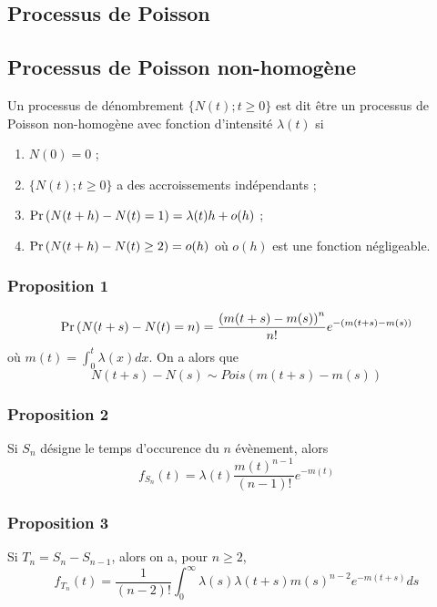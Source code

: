\documentclass[10pt, french, landscape]{article}
\begin{document}
\small
\begin{multicols*}{3} %
\setcounter{section}{2}

\section{Processus de Poisson}
\subsection*{Processus de Poisson non-homogène}
\begin{definition}[Définition]
Un processus de dénombrement $\{ N(t) ; t \geq 0 \}$ est dit être un processus de Poisson non-homogène avec fonction d'intensité $\lambda(t)$ si
\begin{enumerate}[label=(\arabic*)]
\item $N(0) = 0$ ;
\item $\{ N(t) ; t \geq 0 \}$ a des accroissements indépendants ;
\item $\Pr \left( N(t+h) - N(t) = 1 \right) = \lambda(t) h + o(h)$ ;
\item $\Pr \left( N(t+h) - N(t) \geq 2 \right) = o(h)$ où $o(h)$ est une fonction négligeable.
\end{enumerate}
\end{definition}

\subsubsection*{Proposition 1}
\[\Pr \left( N(t+s) - N(t) = n \right)  = \frac{\left(m(t+s) - m(s) \right)^n}{n!} e^{-(m(t+s) - m(s))} \]
où $m(t) = \int_{0}^{t} \lambda(x) dx$. On a alors que
\[N(t+s) - N(s) \sim Pois(m(t+s) - m(s))\]


\subsubsection*{Proposition 2}
Si $S_n$ désigne le temps d'occurence du $n$ évènement, alors
\[f_{S_n}(t) = \lambda(t) \frac{m(t)^{n-1}}{(n-1)!} e^{-m(t)} \]

\subsubsection*{Proposition 3}
Si $T_n = S_{n} - S_{n-1}$, alors on a, pour $n \geq 2$,
\[f_{T_n}(t) = \frac{1}{(n-2)!} \int_{0}^{\infty} \lambda(s) \lambda(t+s) m(s)^{n-2} e^{-m(t+s)} ds \]

\columnbreak %

\end{multicols*}
\end{document}
